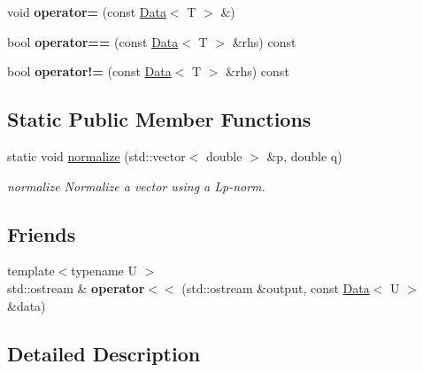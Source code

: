 \begin{DoxyCompactItemize}
\item 
void {\bfseries operator=} (const \hyperlink{class_data}{Data}$<$ T $>$ \&)\hypertarget{class_data_a108d2986a26cfe07f7a4ee5a2e8e1c9b}{}\label{class_data_a108d2986a26cfe07f7a4ee5a2e8e1c9b}

\item 
bool {\bfseries operator==} (const \hyperlink{class_data}{Data}$<$ T $>$ \&rhs) const \hypertarget{class_data_aa17ec8c5f516e078a1c7e60b4a72ef8f}{}\label{class_data_aa17ec8c5f516e078a1c7e60b4a72ef8f}

\item 
bool {\bfseries operator!=} (const \hyperlink{class_data}{Data}$<$ T $>$ \&rhs) const \hypertarget{class_data_a7c845a5e03a06eb0a398ba197728c119}{}\label{class_data_a7c845a5e03a06eb0a398ba197728c119}

\end{DoxyCompactItemize}
\subsection*{Static Public Member Functions}
\begin{DoxyCompactItemize}
\item 
static void \hyperlink{class_data_ad5c41d33e1de7531b952d6f33b7eca90}{normalize} (std\+::vector$<$ double $>$ \&p, double q)
\begin{DoxyCompactList}\small\item\em normalize Normalize a vector using a Lp-\/norm. \end{DoxyCompactList}\end{DoxyCompactItemize}
\subsection*{Friends}
\begin{DoxyCompactItemize}
\item 
{\footnotesize template$<$typename U $>$ }\\std\+::ostream \& {\bfseries operator$<$$<$} (std\+::ostream \&output, const \hyperlink{class_data}{Data}$<$ U $>$ \&data)\hypertarget{class_data_a6e0fbda87f04e3f9960f8f2a818e2f9d}{}\label{class_data_a6e0fbda87f04e3f9960f8f2a818e2f9d}

\end{DoxyCompactItemize}


\subsection{Detailed Description}
